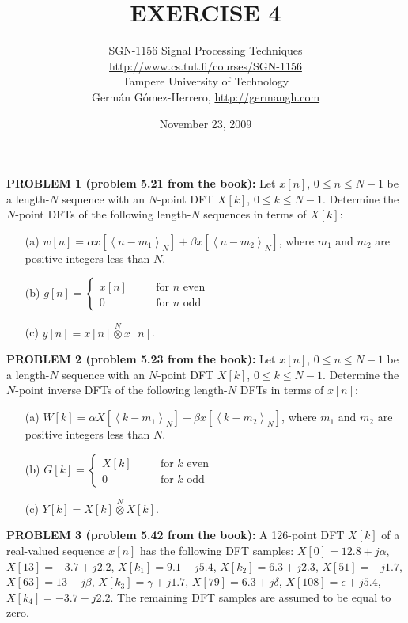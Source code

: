 \documentclass[a4paper,11pt,oneside]{article}
\title{\large{\textbf{EXERCISE 4}}}
\author{SGN-1156 Signal Processing Techniques\\
\url{http://www.cs.tut.fi/courses/SGN-1156}\\
Tampere University of Technology\\
Germ\'an G\'omez-Herrero, \url{http://germangh.com}}
\date{November 23, 2009}
\begin{document}
\maketitle

\noindent \textbf{PROBLEM 1 (problem 5.21 from the book):} Let $x[n]$, $0\leq n \leq N-1$ be a length-$N$ sequence with an $N$-point DFT $X[k]$, $0 \leq k \leq N-1$. Determine the $N$-point DFTs of the following length-$N$ sequences in terms of $X[k]$:

\begin{itemize}
\item[(a)] $w[n]=\alpha x[\left\langle n-m_1\right\rangle_{N}]+\beta x[\left\langle n-m_2\right\rangle_{N}]$, where $m_1$ and $m_2$ are positive integers less than $N$.
\item[(b)] $g[n]=\left\{\begin{array}{lll}x[n]&\quad&\textrm{for } n \textrm{ even}\\0&\quad&\textrm{for } n \textrm{ odd}\end{array}\right.$
\item[(c)] $y[n]=x[n]\stackrel{N}{\otimes} x[n]$. 
\end{itemize}


\vspace{1cm}

\noindent \textbf{PROBLEM 2 (problem 5.23 from the book):} Let $x[n]$, $0\leq n \leq N-1$ be a length-$N$ sequence with an $N$-point DFT $X[k]$, $0\leq k \leq N-1$. Determine the $N$-point inverse DFTs of the following length-$N$ DFTs in terms of $x[n]$:

\begin{itemize}
\item[(a)] $W[k]=\alpha X[\left\langle k-m_1\right\rangle_{N}]+\beta x[\left\langle k-m_2\right\rangle_{N}]$, where $m_1$ and $m_2$ are positive integers less than $N$.
\item[(b)] $G[k]=\left\{\begin{array}{lll}X[k]&\quad&\textrm{for } k \textrm{ even}\\0&\quad&\textrm{for } k \textrm{ odd}\end{array}\right.$
\item[(c)] $Y[k]=X[k]\stackrel{N}{\otimes} X[k]$. 
\end{itemize}


\vspace{1cm}

\noindent \textbf{PROBLEM 3 (problem 5.42 from the book):} A 126-point DFT $X[k]$ of a real-valued sequence $x[n]$ has the following DFT samples: $X[0]=12.8+j\alpha$, $X[13]=-3.7+j2.2$, $X[k_1]=9.1-j5.4$, $X[k_2]=6.3+j2.3$, $X[51]=-j1.7$, $X[63]=13+j\beta$, $X[k_3]=\gamma+j1.7$, $X[79]=6.3+j\delta$, $X[108]=\epsilon+j5.4$, $X[k_4]=-3.7-j2.2$. The remaining DFT samples are assumed to be equal to zero.
\end{document}
